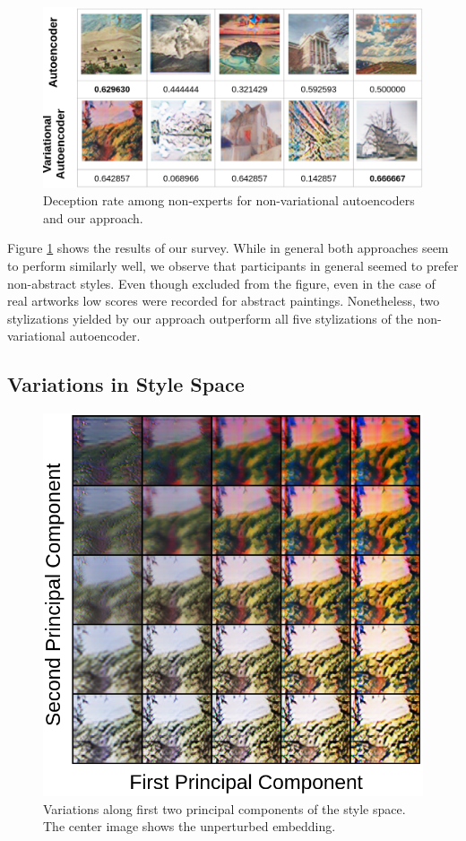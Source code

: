 \documentclass[10pt,twocolumn,letterpaper]{article}
\begin{document}
\begin{figure}
\centering
\includegraphics[width=0.9\linewidth]{survey.png}
\caption{Deception rate among non-experts for non-variational autoencoders and our approach.}
\label{fig:survey}
\end{figure}

Figure \ref{fig:survey} shows the results of our survey. While in general both approaches seem to perform similarly well, we observe that participants in general seemed to prefer non-abstract styles. Even though excluded from the figure, even in the case of real artworks low scores were recorded for abstract paintings. Nonetheless, two stylizations yielded by our approach outperform all five stylizations of the non-variational autoencoder.


\subsection{Variations in Style Space}

\begin{figure}
\centering
\includegraphics[width=0.8\linewidth]{pca.png}
\caption{Variations along first two principal components of the style space. The center image shows the unperturbed embedding.}
\label{fig:pca}
\end{figure}
\end{document}
